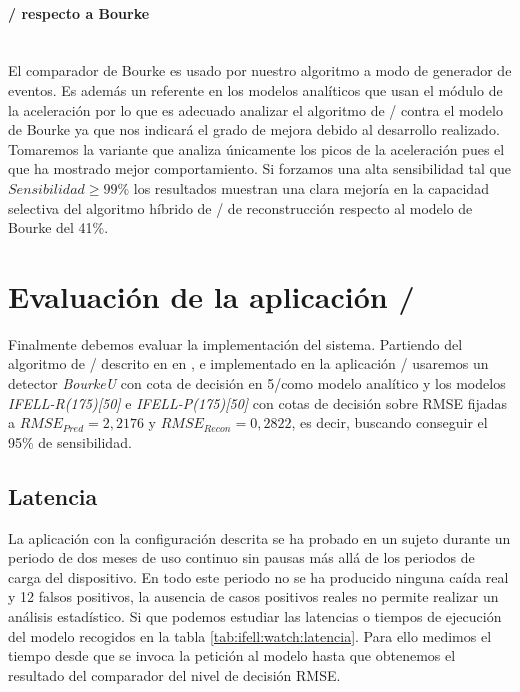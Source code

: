 
\paragraph{\ifell/ respecto a Bourke}\\
El comparador de Bourke es usado por nuestro algoritmo a modo de generador de eventos. Es además un referente en los modelos analíticos que usan el módulo de la aceleración por lo que es adecuado analizar el algoritmo de \ifell/ contra el modelo de Bourke ya que nos indicará el grado de mejora debido al desarrollo realizado. Tomaremos la variante que analiza únicamente los picos de la aceleración pues el que ha mostrado mejor comportamiento. Si forzamos una alta sensibilidad tal que $Sensibilidad \geq 99\%$ los resultados muestran una clara mejoría en la capacidad selectiva del algoritmo híbrido de \ifell/ de reconstrucción respecto al modelo de Bourke del 41\%. 


\section{Evaluación de la aplicación \ifell/}

  Finalmente debemos evaluar la implementación del sistema. Partiendo del algoritmo de \ifell/ descrito en en , e implementado en la aplicación \ifell/ usaremos un detector \textit{BourkeU} con cota de decisión en 5\g/como modelo analítico y los modelos \textit{IFELL-R(175)[50]} e \textit{IFELL-P(175)[50]} con cotas de decisión sobre RMSE fijadas a $RMSE_{Pred}=2,2176$ y $RMSE_{Recon}=0,2822$, es decir, buscando conseguir el 95\% de sensibilidad.

\subsection{Latencia}
    La aplicación con la configuración descrita se ha probado en un sujeto durante un periodo de dos meses de uso continuo sin pausas más allá de los periodos de carga del dispositivo. En todo este periodo no se ha producido ninguna caída real y 12 falsos positivos, la ausencia de casos positivos reales no permite realizar un análisis estadístico. Si que podemos estudiar las latencias o tiempos de ejecución del modelo recogidos en la tabla \ref{tab:ifell:watch:latencia}. Para ello medimos el tiempo desde que se invoca la petición al modelo hasta que obtenemos el resultado del comparador del nivel de decisión RMSE. 

